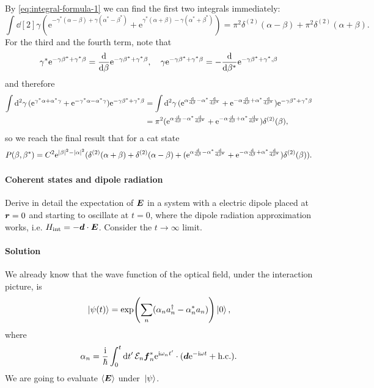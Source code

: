 \documentclass[hyperref, a4paper]{article}
\newcommand*{\ii}{\mathrm{i}}
\newcommand*{\ee}{\mathrm{e}}
\begin{document}
\begin{itemize}
\[    \]
    By \eqref{eq:integral-formula-1} we can find the first two integrals immediately:
    \[
        \int \dd[2]{\gamma} (\ee^{-\gamma^* (\alpha - \beta) + \gamma (\alpha^* - \beta^*)} + \ee^{\gamma^* (\alpha + \beta) - \gamma (\alpha^* + \beta^*)} ) = \pi^2 \delta^{(2)}(\alpha - \beta) + \pi^2 \delta^{(2)}(\alpha + \beta).
    \]
    For the third and the fourth term, note that 
    \[
        \gamma^* \ee^{- \gamma \beta^* + \gamma^* \beta} = \dv{\beta} \ee^{- \gamma \beta^* + \gamma^* \beta}, \quad \gamma \ee^{- \gamma \beta^* + \gamma^* \beta} = - \dv{\beta^*} \ee^{- \gamma \beta^* + \gamma^* ,\beta}
    \]
    and therefore
    \[
        \begin{aligned}
            \int \dd[2]{\gamma} (\ee^{\gamma^* \alpha + \alpha^* \gamma} + \ee^{- \gamma^* \alpha - \alpha^* \gamma}) \ee^{- \gamma \beta^* + \gamma^* \beta} &= \int \dd[2]{\gamma} (\ee^{ \alpha \dv{\beta} - \alpha^* \dv{\beta^*}} + \ee^{- \alpha \dv{\beta} + \alpha^* \dv{\beta^*}}) \ee^{- \gamma \beta^* + \gamma^* \beta} \\
            &= \pi^2 (\ee^{ \alpha \dv{\beta} - \alpha^* \dv{\beta^*}} + \ee^{- \alpha \dv{\beta} + \alpha^* \dv{\beta^*}}) \delta^{(2)}(\beta),
        \end{aligned}
    \]
    so we reach the final result that for a cat state
    \begin{equation}
        P(\beta, \beta^*) = C^2 \ee^{\abs{\beta}^2 - \abs{\alpha}^2} (\delta^{(2)}(\alpha+\beta) + \delta^{(2)}(\alpha - \beta) + (\ee^{ \alpha \dv{\beta} - \alpha^* \dv{\beta^*}} + \ee^{- \alpha \dv{\beta} + \alpha^* \dv{\beta^*}}) \delta^{(2)}(\beta)).
    \end{equation}
\end{itemize}

\paragraph{Coherent states and dipole radiation} Derive in detail the expectation of $\vb*{E}$ in a system with a electric dipole placed at $\vb*{r}=0$ and starting to oscillate at $t=0$, where the dipole radiation approximation works, i.e. $H_\text{int} = - \vb*{d} \cdot \vb*{E}$. Consider the $t \to \infty$ limit.

\paragraph{Solution} We already know that the wave function of the optical field, under the interaction picture, is 
\begin{equation}
    \ket*{\psi(t)} = \exp(\sum_n (\alpha_n a_n^\dagger - \alpha_n^* a_n) ) \ket*{0},
\end{equation}
where 
\begin{equation}
    \alpha_n = \frac{\ii}{\hbar} \int_0^t \dd{t'} \mathcal{E}_n \vb*{f}_n^* \ee^{\ii \omega_n t'} \cdot (\vb*{d} \ee^{- \ii \omega t} + \text{h.c.}).
\end{equation}
We are going to evaluate $\expval{\vb*{E}}$ under $\ket*{\psi}$.
\end{document}
